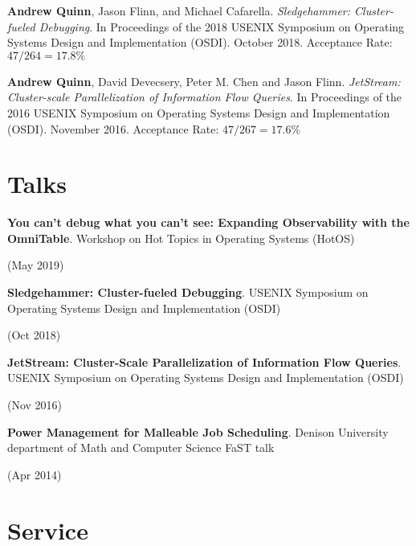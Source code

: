 \documentclass[letterpaper,10pt]{article}
\newcommand{\sidebyside}[2]{
  \begin{minipage}[t]{.75\textwidth}
    \raggedright{}
    #2
  \end{minipage}
  \hspace{.01\textwidth}
    \begin{minipage}[t]{.205\textwidth}
    \raggedleft
    #1
  \end{minipage}
}
\newcommand{\paper}[3]{#1. #2 #3}
\newcommand{\trio}[3]{\sidebyside{#3}{\textbf{#1}. #2}}
\begin{document}
\begin{smenumerate}
  \item \paper{\textbf{Andrew Quinn}, Jason Flinn, and Michael Cafarella}{
    \emph{Sledgehammer: Cluster-fueled Debugging}.  In Proceedings of the 2018
    USENIX Symposium on Operating Systems Design and Implementation (OSDI).
    October 2018.}{Acceptance Rate: $47/264 = 17.8\%$}

  \item \paper{\textbf{Andrew Quinn}, David Devecsery, Peter M. Chen and Jason
    Flinn}{\emph{JetStream: Cluster-scale Parallelization of Information
    Flow Queries}.  In Proceedings of the 2016 USENIX Symposium on
    Operating Systems Design and Implementation (OSDI). November
    2016.}{Acceptance Rate: $47/267=17.6\%$}
\end{smenumerate}

\section{Talks}
\begin{smenumerate}
\item\trio{You can't debug what you can't see: Expanding Observability with the
  OmniTable}{Workshop on Hot Topics in Operating Systems (HotOS)}{(May 2019)}

\item\trio{Sledgehammer: Cluster-fueled Debugging}{USENIX Symposium on Operating
  Systems Design and Implementation (OSDI)}{(Oct 2018)}

\item\trio{JetStream: Cluster-Scale Parallelization of Information Flow
  Queries}{USENIX Symposium on Operating Systems Design and Implementation
  (OSDI)}{(Nov 2016)}

\item\trio{Power Management for Malleable Job Scheduling}{Denison University
  department of Math and Computer Science FaST talk}{(Apr 2014)}
\end{smenumerate}


\section{Service}
\end{document}
